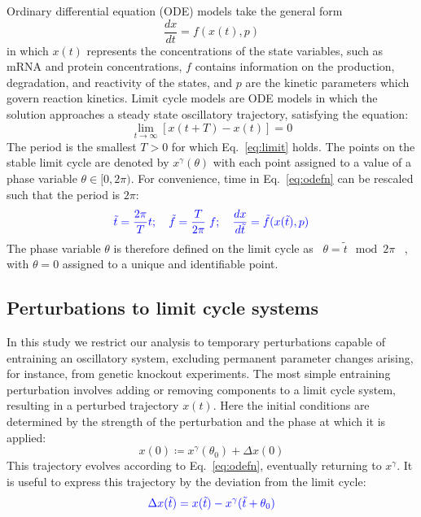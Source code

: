 \documentclass[11pt, letterpaper]{article}
\providecommand{\DIFadd}[1]{{\protect\color{blue}#1}} %
\providecommand{\DIFaddbegin}{} %
\providecommand{\DIFaddend}{} %
\begin{document}
\DIFaddend Ordinary differential equation (ODE) models take the general form
\begin{equation}
  \frac{dx}{dt} = f(x(t), p)
  \label{eq:odefn}
\end{equation}
in which $x(t)$ represents the \DIFaddbegin \DIFadd{concentrations }\DIFaddend of the state variables, such as mRNA and protein concentrations, $f$ contains information on the production, degradation, and reactivity of the states, and $p$ are the kinetic parameters which govern reaction kinetics.
Limit cycle models are ODE models in which the solution approaches a steady state oscillatory trajectory, satisfying the equation: \begin{equation}
  \lim_{t \to \infty} \left[ x(t + T) - x(t) \right] = 0
  \label{eq:limit}
\end{equation}
The period is the smallest $T > 0$ for which Eq.\DIFaddbegin \DIFadd{~}\DIFaddend \ref{eq:limit} holds.
The points on the stable limit cycle are denoted by $x^\gamma(\theta)$ with each point assigned to a value of a phase variable $\theta \in [0, 2\pi)$.
For convenience, time in Eq.~\ref{eq:odefn} can be rescaled such that the period is $2\pi$:
\DIFaddbegin \begin{equation}\DIFadd{
  \tilde{t} = \frac{2\pi}{T}t; \quad \tilde{f} = \frac{T}{2\pi}\;f; \quad \frac{dx}{d\tilde{t}} = \tilde{f}(x(\tilde{t}), p)
  \label{eq:that}
}\end{equation}
\DIFaddend The phase variable $\theta$ is therefore defined on the limit cycle as \DIFaddbegin \DIFadd{\mbox{%
$\theta = \tilde{t}\mod 2\pi$
}%
}\DIFaddend , with $\theta = 0$ assigned to a unique and identifiable point.

\subsection*{Perturbations to limit cycle systems}
\DIFaddbegin 

\DIFaddend In this study we restrict our analysis to temporary perturbations capable of entraining an oscillatory system\DIFaddbegin \DIFadd{, excluding }\DIFaddend permanent parameter changes \DIFaddbegin \DIFadd{arising, for instance, }\DIFaddend from genetic knockout experiments.
The most simple entraining perturbation involves adding or removing components to a limit cycle system, resulting in a perturbed trajectory $x(t)$.
Here the initial conditions are determined by the strength of the perturbation and the phase at which it is applied:
\begin{equation}
  x(0) \coloneqq x^\gamma(\theta_0) + \Delta x(0)
  \label{eq:stateperturbation}
\end{equation}
This trajectory evolves according to Eq.~\ref{eq:odefn}, eventually returning to $x^\gamma$.
It is useful to express this trajectory by the deviation from the limit cycle:
\DIFaddbegin \begin{equation}\DIFadd{
  \Delta x(\tilde{t}) = x(\tilde{t}) - x^\gamma(\tilde{t} + \theta_0)
  \label{eq:delxt}
}\end{equation}
\DIFaddend 
\end{document}
